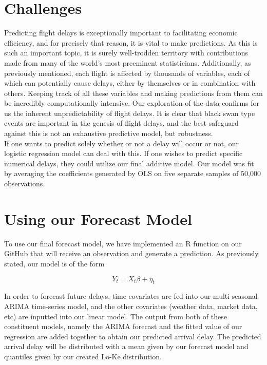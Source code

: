 \documentclass[12pt, a4paper, openany]{book}
\newcommand\tab[1][1cm]{\hspace*{#1}}
\begin{document}
	\section{Challenges}
	\tab Predicting flight delays is exceptionally important to facilitating economic efficiency, and for precisely that reason, it is vital to make predictions. As this is such an important topic, it is surely well-trodden territory with contributions made from many of the world's most preeminent statisticians. Additionally, as previously mentioned, each flight is affected by thousands of variables, each of which can potentially cause delays, either by themselves or in combination with others. Keeping track of all these variables and making predictions from them can be incredibly computationally intensive. Our exploration of the data confirms for us the inherent unpredictability of flight delays. It is clear that black swan type events are important in the genesis of flight delays, and the best safeguard against this is not an exhaustive predictive model, but robustness.\\
	\tab If one wants to predict solely whether or not a delay will occur or not, our logistic regression model can deal with this. If one wishes to predict specific numerical delays, they could utilize our final additive model. Our model was fit by averaging the coefficients generated by OLS on five separate samples of 50,000 observations. 
	\section{Using our Forecast Model}
	\tab To use our final forecast model, we have implemented an R function on our GitHub that will receive an observation and generate a prediction. As previously stated, our model is of the form \begin{center}
	$$Y_t = X_t\beta + \eta_t$$
	\end{center} 
	\tab In order to forecast future delays, time covariates are fed into our multi-seasonal ARIMA time-series model, and the other covariates (weather data, market data, etc) are inputted into our linear model. The output from both of these constituent models, namely the ARIMA forecast and the fitted value of our regression are added together to obtain our predicted arrival delay. The predicted arrival delay will be distributed with a mean given by our forecast model and quantiles given by our created Lo-Ke distribution. 
\end{document}
